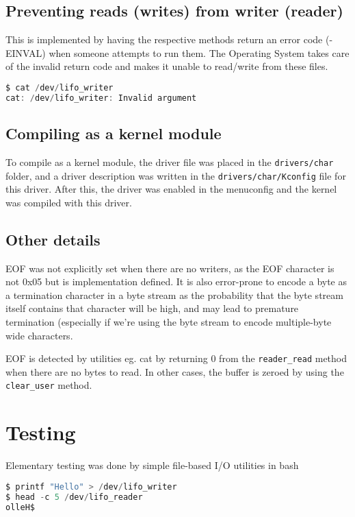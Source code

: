 \documentclass[12pt]{article}
\begin{document}
\subsection{Preventing reads (writes) from writer (reader)}

This is implemented by having the respective methods return an error code (-EINVAL)
when someone attempts to run them. The Operating System takes care of the invalid 
return code and makes it unable to read/write from these files.

\begin{lstlisting}[language=C]
$ cat /dev/lifo_writer 
cat: /dev/lifo_writer: Invalid argument
\end{lstlisting}

\subsection{Compiling as a kernel module}

To compile as a kernel module, the driver file was placed in the \texttt{drivers/char}
folder, and a driver description was written in the \texttt{drivers/char/Kconfig}
file for this driver. After this, the driver was enabled in the menuconfig and
the kernel was compiled with this driver.

\subsection{Other details}

EOF was not explicitly set when there are no writers, as the EOF character is
not 0x05 but is implementation defined. It is also error-prone to encode a byte 
as a termination character in a byte stream as the probability that the byte 
stream itself contains that character will be high, and may lead to premature 
termination (especially if we're using the byte stream to encode multiple-byte 
wide characters. 

EOF is detected by utilities eg. cat by returning 0 from the \texttt{reader\_read}
method when there are no bytes to read. In other cases, the buffer is zeroed 
by using the \texttt{clear\_user} method.

\section{Testing}

Elementary testing was done by simple file-based I/O utilities in bash 

\begin{lstlisting}[language=C]
$ printf "Hello" > /dev/lifo_writer
$ head -c 5 /dev/lifo_reader
olleH$
\end{lstlisting}
\end{document}
